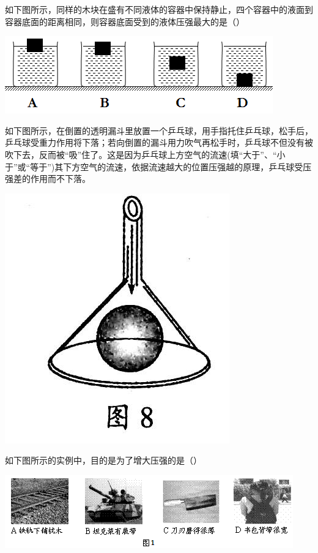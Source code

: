 \documentclass[12pt]{exam}%
\begin{document}
\begin{Aquestions}
\begin{questions}
\question
如下图所示，同样的木块在盛有不同液体的容器中保持静止，四个容器中的液面到容器底面的距离相同，则容器底面受到的液体压强最大的是（\answerline*[A]）

\includegraphics[scale=1]{figures/图片9.png} 


\question
如下图所示，在倒置的透明漏斗里放置一个乒乓球，用手指托住乒乓球，松手后，乒乓球受重力作用将下落；若向倒置的漏斗用力吹气再松手时，乒乓球不但没有被吹下去，反而被“吸”住了。这是因为乒乓球上方空气的流速\answerline*[大于] (填“大于”、“小于”或“等于”)其下方空气的流速，依据流速越大的位置压强越\answerline*[小]的原理，乒乓球受压强差的作用而不下落。

\includegraphics[scale=0.2]{figures/图片10.jpg} 


\question
如下图所示的实例中，目的是为了增大压强的是（\answerline*[C]）

\includegraphics[scale=1]{figures/图片+1.png} 



\end{questions}
\end{Aquestions}
\end{document}
